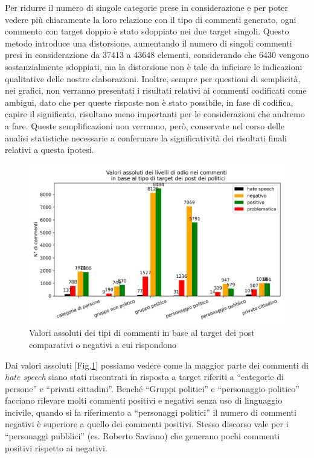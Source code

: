 Per ridurre il numero di singole categorie prese in considerazione e per poter vedere più chiaramente la loro relazione con il tipo di commenti generato, ogni commento con target doppio è stato sdoppiato nei due target singoli. Questo metodo introduce una distorsione, aumentando il numero di singoli commenti presi in considerazione da 37413 a 43648 elementi, considerando che 6430 vengono sostanzialmente sdoppiati, ma la distorsione non è tale da inficiare le indicazioni qualitative delle nostre elaborazioni. Inoltre, sempre per questioni di semplicità, nei grafici, non verranno presentati i risultati relativi ai commenti codificati come ambigui, dato che per queste risposte non è stato possibile, in fase di codifica, capire il significato, risultano meno importanti per le considerazioni che andremo a fare. Queste semplificazioni non verranno, però, conservate  nel corso delle analisi statistiche necessarie a confermare la significatività dei risultati finali relativi a questa ipotesi.
\begin{figure}
	\includegraphics[width=\textwidth]{figures/targetuniq}
	\caption{Valori assoluti dei tipi di commenti in base al target dei post comparativi o negativi a cui rispondono}
	\label{fig:targetuniq}
\end{figure}

Dai valori assoluti [Fig.\ref{fig:targetuniq}] possiamo vedere come la maggior parte dei commenti di \textit{hate speech} siano stati riscontrati in risposta a target riferiti a “categorie di persone” e “privati cittadini”. Benché “Gruppi politici” e “personaggio politico” facciano rilevare molti commenti positivi e negativi senza uso di linguaggio incivile, quando si fa riferimento a “personaggi politici” il numero di commenti negativi è superiore a quello dei commenti positivi. Stesso discorso vale per i “personaggi pubblici” (es. Roberto Saviano) che generano pochi commenti positivi rispetto ai negativi.


